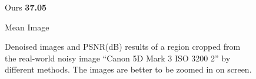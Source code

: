 \begin{figure}[t!]
{\begin{minipage}[t]{0.19\textwidth}
{\footnotesize Ours \textbf{37.05}}
\end{minipage}
\begin{minipage}[t]{0.19\textwidth}
\centering
{}
{\footnotesize Mean Image}
\end{minipage}
}\vspace{-3mm}
    \caption{Denoised images and PSNR(dB) results of a region cropped from the real-world noisy image ``Canon 5D Mark 3 ISO 3200 2'' \cite{crosschannel2016} by different methods. The images are better to be zoomed in on screen.}
    \label{fig3-13}
\end{figure}


